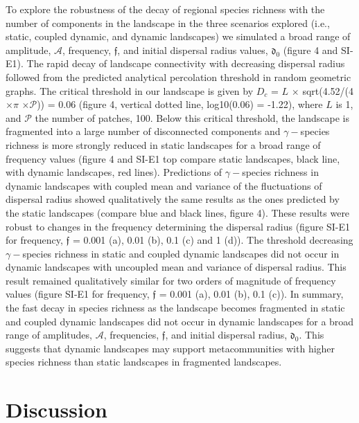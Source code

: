 \documentclass[12pt]{article}
\begin{document}
    To explore the robustness of the decay of regional species richness with the number of components in the landscape in the three scenarios explored (i.e., static, coupled dynamic, and dynamic landscapes) we simulated a broad range of amplitude, $\mathcal{A}$, frequency, $\mathfrak{f}$, and initial dispersal radius values, $\mathfrak{d_{0}}$ (figure 4 and SI-E1). The rapid decay of landscape connectivity with decreasing dispersal radius followed from the predicted analytical percolation threshold in random geometric graphs. The critical threshold in our landscape is given by $D_c$ = $L$ $\times$ sqrt(4.52/(4 $\times$$\pi$ $\times$$\mathcal{P}$)) = 0.06 (figure 4, vertical dotted line, log10(0.06) = -1.22), where $L$ is 1, and $\mathcal{P}$ the number of patches, 100. Below this critical threshold, the landscape is fragmented into a large number of disconnected components and $\gamma-$species richness is more strongly reduced in static landscapes for a broad range of frequency values (figure 4 and SI-E1 top compare static landscapes, black line, with dynamic landscapes, red lines). Predictions of $\gamma-$species richness in dynamic landscapes with coupled mean and variance of the fluctuations of dispersal radius showed qualitatively the same results as the ones predicted by the static landscapes (compare blue and black lines, figure 4). These results were robust to changes in the frequency determining the dispersal radius (figure SI-E1 for frequency, $\mathfrak{f}$ = 0.001 (a), 0.01 (b), 0.1 (c) and 1 (d)). The threshold decreasing $\gamma-$species richness in static and coupled dynamic landscapes did not occur in dynamic landscapes with uncoupled mean and variance of dispersal radius. This result remained qualitatively similar for two orders of magnitude of frequency values (figure SI-E1 for frequency, $\mathfrak{f}$ = 0.001 (a), 0.01 (b), 0.1 (c)). In summary, the fast decay in species richness as the landscape becomes fragmented in static and coupled dynamic landscapes did not occur in dynamic landscapes for a broad range of amplitudes, $\mathcal{A}$, frequencies, $\mathfrak{f}$, and initial dispersal radius, $\mathfrak{d_{0}}$. This suggests that dynamic landscapes may support metacommunities with higher species richness than static landscapes in fragmented landscapes.
    
    \section*{Discussion}
     
\end{document}
